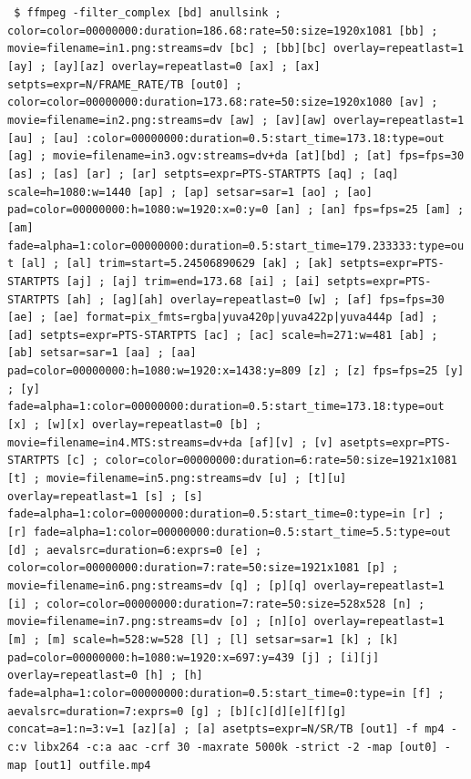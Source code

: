\documentclass[20pt]{beamer}
\begin{document}
\begin{center}
{\begin{flushleft}
    \texttt{
        \$ ffmpeg -filter\_complex [bd] anullsink  ; 
        color=color=00000000:duration=186.68:rate=50:size=1920x1081 [bb] ;
        movie=filename=in1.png:streams=dv [bc] ; 
        [bb][bc] overlay=repeatlast=1 [ay] ; [ay][az] overlay=repeatlast=0 [ax] ; [ax] setpts=expr=N/FRAME\_RATE/TB [out0] ;  
        color=color=00000000:duration=173.68:rate=50:size=1920x1080 [av] ;  
        movie=filename=in2.png:streams=dv [aw] ; 
        [av][aw] overlay=repeatlast=1 [au] ; [au] :color=00000000:duration=0.5:start\_time=173.18:type=out [ag] ; 
        movie=filename=in3.ogv:streams=dv+da [at][bd] ;
        [at] fps=fps=30 [as] ; [as]  [ar] ; [ar] setpts=expr=PTS-STARTPTS [aq] ;
        [aq] scale=h=1080:w=1440 [ap] ; [ap] setsar=sar=1 [ao] ; [ao] pad=color=00000000:h=1080:w=1920:x=0:y=0 [an] ; [an] fps=fps=25 [am] ;
        [am] fade=alpha=1:color=00000000:duration=0.5:start\_time=179.233333:type=out [al] ; [al] trim=start=5.24506890629 [ak] ;
        [ak] setpts=expr=PTS-STARTPTS [aj] ; [aj] trim=end=173.68 [ai] ; [ai] setpts=expr=PTS-STARTPTS [ah] ; [ag][ah] overlay=repeatlast=0 [w] ;
        [af] fps=fps=30 [ae] ; [ae] format=pix\_fmts=rgba|yuva420p|yuva422p|yuva444p [ad] ; [ad] setpts=expr=PTS-STARTPTS [ac] ;
        [ac] scale=h=271:w=481 [ab] ; [ab] setsar=sar=1 [aa] ; [aa] pad=color=00000000:h=1080:w=1920:x=1438:y=809 [z] ; [z] fps=fps=25 [y] ;
        [y] fade=alpha=1:color=00000000:duration=0.5:start\_time=173.18:type=out [x] ; [w][x] overlay=repeatlast=0 [b] ;
        movie=filename=in4.MTS:streams=dv+da [af][v] ;
        [v] asetpts=expr=PTS-STARTPTS [c] ;  color=color=00000000:duration=6:rate=50:size=1921x1081 [t] ;
        movie=filename=in5.png:streams=dv [u] ;
        [t][u] overlay=repeatlast=1 [s] ; [s] fade=alpha=1:color=00000000:duration=0.5:start\_time=0:type=in [r] ;
        [r] fade=alpha=1:color=00000000:duration=0.5:start\_time=5.5:type=out [d] ;  aevalsrc=duration=6:exprs=0 [e] ;
        color=color=00000000:duration=7:rate=50:size=1921x1081 [p] ;
        movie=filename=in6.png:streams=dv [q] ; 
        [p][q] overlay=repeatlast=1 [i] ;  color=color=00000000:duration=7:rate=50:size=528x528 [n] ;
        movie=filename=in7.png:streams=dv [o] ; 
        [n][o] overlay=repeatlast=1 [m] ; [m] scale=h=528:w=528 [l] ; [l] setsar=sar=1 [k] ; [k] pad=color=00000000:h=1080:w=1920:x=697:y=439 [j] ;
        [i][j] overlay=repeatlast=0 [h] ; [h] fade=alpha=1:color=00000000:duration=0.5:start\_time=0:type=in [f] ;  aevalsrc=duration=7:exprs=0 [g] ; 
        [b][c][d][e][f][g] concat=a=1:n=3:v=1 [az][a] ; [a] asetpts=expr=N/SR/TB [out1]
        -f mp4 -c:v libx264 -c:a aac -crf 30 -maxrate 5000k -strict -2 -map [out0] -map [out1]
        outfile.mp4
    }
    \end{flushleft} 
}

\end{center}
\end{document}
